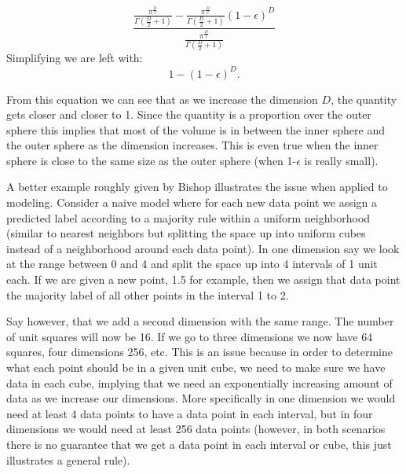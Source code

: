 \begin{equation}
\frac{\frac{\pi^{\frac{D}{2}}}{\Gamma(\frac{D}{2} + 1)} - \frac{\pi^{\frac{D}{2}}}{\Gamma(\frac{D}{2} + 1)} (1-\epsilon)^{D}}{\frac{\pi^{\frac{D}{2}}}{\Gamma(\frac{D}{2} + 1)}}
\end{equation}
Simplifying we are left with:
\begin{equation}
1 - (1-\epsilon)^D.
\end{equation}

From this equation we can see that as we increase the dimension $D$, the quantity gets closer and closer to 1. Since the quantity is a proportion over the outer sphere this implies that most of the volume is in between the inner sphere and the outer sphere as the dimension increases. This is even true when the inner sphere is close to the same size as the outer sphere (when 1-$\epsilon$ is really small).

A better example roughly given by Bishop illustrates the issue when applied to modeling. Consider a naive model where for each new data point we assign a predicted label according to a majority rule within a uniform neighborhood (similar to nearest neighbors but splitting the space up into uniform cubes instead of a neighborhood around each data point). In one dimension say we look at the range between 0 and 4 and split the space up into 4 intervals of 1 unit each. If we are given a new point, 1.5 for example, then we assign that data point the majority label of all other points in the interval 1 to 2. 

Say however, that we add a second dimension with the same range. The number of unit squares will now be 16. If we go to three dimensions we now have 64 squares, four dimensions 256, etc. This is an issue because in order to determine what each point should be in a given unit cube, we need to make sure we have data in each cube, implying that we need an exponentially increasing amount of data as we increase our dimensions. More specifically in one dimension we would need at least 4 data points to have a data point in each interval, but in four dimensions we would need at least 256 data points (however, in both scenarios there is no guarantee that we get a data point in each interval or cube, this just illustrates a general rule).

